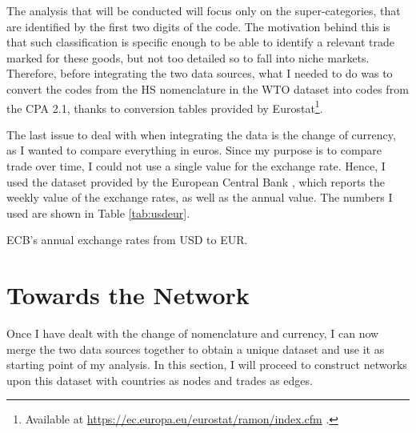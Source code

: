 The analysis that will be conducted will focus only on the super-categories, that are identified by the first two digits of the code. The motivation behind this is that such classification is specific enough to be able to identify a relevant trade marked for these goods, but not too detailed so to fall into niche markets.
Therefore, before integrating the two data sources, what I needed to do was to convert the codes from the HS nomenclature in the WTO dataset into codes from the CPA 2.1, thanks to conversion tables provided by Eurostat\footnote{Available at \url{https://ec.europa.eu/eurostat/ramon/index.cfm} .}.


The last issue to deal with when integrating the data is the change of currency, as I wanted to compare everything in euros. Since my purpose is to compare trade over time, I could not use a single value for the exchange rate. Hence, I used the dataset provided by the European Central Bank \cite{ecb2021usdeur}, which reports the weekly value of the exchange rates, as well as the annual value. The numbers I used are shown in Table \ref{tab:usdeur}.

\begin{table}
    \centering
    
    \caption{ECB's annual exchange rates from USD to EUR.}
    \label{tab:usdeur}
\end{table}


\section{Towards the Network}

Once I have dealt with the change of nomenclature and currency, I can now merge the two data sources together to obtain a unique dataset and use it as starting point of my analysis. In this section, I will proceed to construct networks upon this dataset with countries as nodes and trades as edges. 

